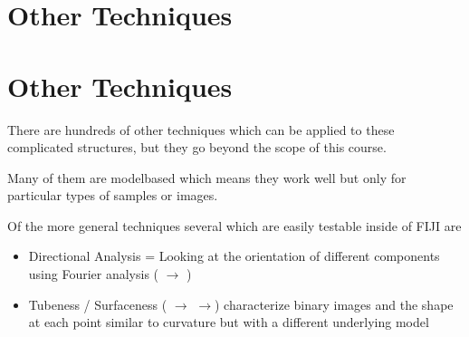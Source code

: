 \documentclass[letterpaper,10pt,english]{sphinxmanual}
\begin{document}
\chapter{Other Techniques}
\label{\detokenize{06-AdvancedShapeAndTexture:other-techniques}}

\chapter{Other Techniques}
\label{\detokenize{06-AdvancedShapeAndTexture:id1}}
\sphinxAtStartPar
There are hundreds of other techniques which can be applied to these complicated structures, but they go beyond the scope of this course.

\sphinxAtStartPar
Many of them are model\sphinxhyphen{}based which means they work well but only for particular types of samples or images.

\sphinxAtStartPar
Of the more general techniques several which are easily testable inside of FIJI are
\begin{itemize}
\item {} 
\sphinxAtStartPar
Directional Analysis = Looking at the orientation of different components using Fourier analysis ( \(\rightarrow\) )

\item {} 
\sphinxAtStartPar
Tubeness / Surfaceness ( \(\rightarrow\)  \(\rightarrow\)) characterize binary images and the shape at each point similar to curvature but with a different underlying model

\end{itemize}
\end{document}
